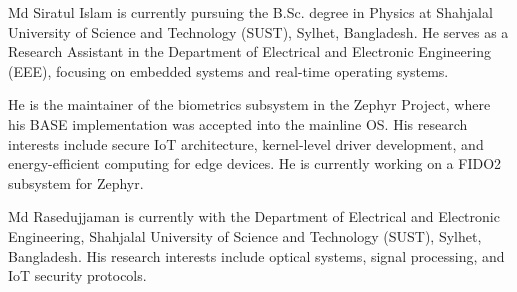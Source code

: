 \documentclass[a4paper,fleqn]{cas-dc}
\begin{document}
\maketitle









\printcredits

% 




\bio{}
Md Siratul Islam is currently pursuing the B.Sc. degree in Physics at Shahjalal University of Science and Technology (SUST), Sylhet, Bangladesh. He serves as a Research Assistant in the Department of Electrical and Electronic Engineering (EEE), focusing on embedded systems and real-time operating systems.

He is the maintainer of the biometrics subsystem in the Zephyr Project, where his BASE implementation was accepted into the mainline OS. His research interests include secure IoT architecture, kernel-level driver development, and energy-efficient computing for edge devices. He is currently working on a FIDO2 subsystem for Zephyr.
\endbio

\bio{}
Md Rasedujjaman is currently with the Department of Electrical and Electronic Engineering, Shahjalal University of Science and Technology (SUST), Sylhet, Bangladesh. His research interests include optical systems, signal processing, and IoT security protocols.
\endbio
\end{document}
